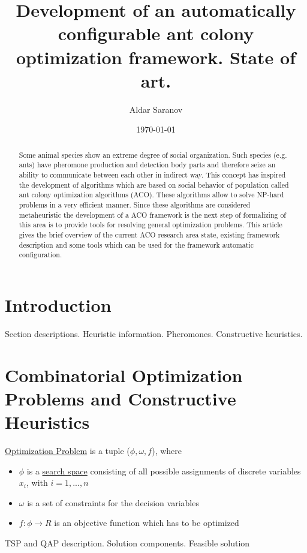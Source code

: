 \documentclass[12pt]{article}
\author{Aldar Saranov}
\date{\today}
\title{Development of an automatically configurable ant colony optimization framework. State of art.}
\begin{document}
\maketitle 
\newpage

\tableofcontents
\newpage

\begin{abstract}
Some animal species show an extreme degree of social organization. Such species (e.g. ants) have pheromone production and detection body parts and therefore seize an ability to communicate between each other in indirect way. This concept has inspired the development of algorithms which are based on social behavior of population called ant colony optimization algorithms (ACO). These algorithms allow to solve NP-hard problems in a very efficient manner. Since these algorithms are considered metaheuristic the development of a ACO framework is the next step of formalizing of this area is to provide tools for resolving general optimization problems. This article gives the brief overview of the current ACO research area state, existing framework description and some tools which can be used for the framework automatic configuration.
\end{abstract}

\section{Introduction}
Section descriptions.
Heuristic information.
Pheromones.
Constructive heuristics.

\section{Combinatorial Optimization Problems and Constructive
Heuristics}


\begin{definition}
	\underline{Optimization Problem} is a tuple ($\phi,\omega, f$), where
	\begin{itemize}
		\item{$\phi$ is a \underline{search space} consisting of all possible assignments of discrete variables $x_i$, with $i=1,...,n$ }
		\item{$\omega$ is a set of constraints for the decision variables}
		\item{$f:\phi \to R$ is an objective function which has to be optimized}
	\end{itemize}
\end{definition}


TSP and QAP description.
Solution components.
Feasible solution
\end{document}
